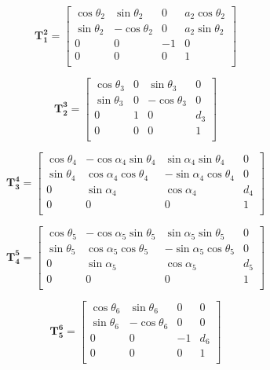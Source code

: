 \documentclass[times, utf8, diplomski, numeric]{fer}
\begin{document}
\begin{equation}
\mathbf{T_1^2} =\begin{bmatrix} \cos\theta_{2}& \sin\theta_{2} & 0 & a_{2}\cos\theta_{2}\\ 
\sin\theta_{2}& -\cos\theta_{2} & 0 & a_{2}\sin\theta_{2}\\ 
0 & 0 & -1 & 0\\
0 & 0 & 0 & 1\\
\end{bmatrix}
\end{equation}

\begin{equation}
\mathbf{T_2^3} =\begin{bmatrix} \cos\theta_{3}& 0 & \sin\theta_{3} & 0\\ 
\sin\theta_{3}& 0 & -\cos\theta_{3} & 0\\
0 & 1 & 0 & d_{3}\\
0 & 0 & 0 & 1\\
\end{bmatrix}
\end{equation}

\begin{equation}
\mathbf{T_3^4} =\begin{bmatrix} \cos\theta_{4}& -\cos\alpha_{4}\sin\theta_{4} & \sin\alpha_{4}\sin\theta_{4} & 0\\ 
\sin\theta_{4}& \cos\alpha_{4}\cos\theta_{4} & -\sin\alpha_{4}\cos\theta_{4} & 0\\
0 & \sin\alpha_{4} & \cos\alpha_{4} & d_{4}\\
0 & 0 & 0 & 1\\
\end{bmatrix}
\end{equation}

\begin{equation}
\mathbf{T_4^5} =\begin{bmatrix} \cos\theta_{5}& -\cos\alpha_{5}\sin\theta_{5} & \sin\alpha_{5}\sin\theta_{5} & 0\\ 
\sin\theta_{5}& \cos\alpha_{5}\cos\theta_{5} & -\sin\alpha_{5}\cos\theta_{5} & 0\\
0 & \sin\alpha_{5} & \cos\alpha_{5} & d_{5}\\
0 & 0 & 0 & 1\\
\end{bmatrix}
\end{equation}

\begin{equation}
\mathbf{T_5^6} =\begin{bmatrix} \cos\theta_{6}& \sin\theta_{6} & 0 & 0\\ 
\sin\theta_{6}& -\cos\theta_{6} & 0 & 0\\ 
0 & 0 & -1 & d_{6}\\
0 & 0 & 0 & 1\\
\end{bmatrix}
\end{equation}
\end{document}
